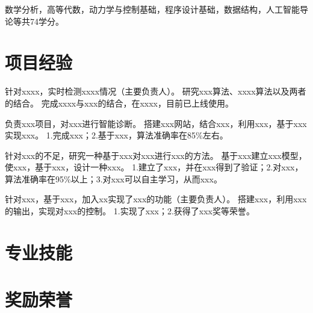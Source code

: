 \documentclass{resume}
\begin{document}
\qquad \qquad 数学分析，高等代数，动力学与控制基础，程序设计基础，数据结构，人工智能导论等共74学分。

\section{项目经验}
\Content
{针对xxxx，实时检测xxxx情况（主要负责人）。}
{研究xxx算法、xxxx算法以及两者的结合。}
{完成xxxx与xxx的结合，在xxxx，目前已上线使用。}

\Content
{负责xxx项目，对xxx进行智能诊断。}
{搭建xxx网站，结合xxx，利用xxx，基于xxx实现xxx。}
{1.完成xxx；2.基于xxx，算法准确率在85\%左右。}

\Content
{针对xxx的不足，研究一种基于xxx对xxx进行xxx的方法。}
{基于xxx建立xxx模型，使xxx，基于xxx，设计一种xxx。}
{1.建立了xxx，并在xxx得到了验证；2.对xxx，算法准确率在95\%以上；3.对xxx可以自主学习，从而xxx。}

\Content
{针对xxx，基于xxx，加入xx实现了xxx的功能（主要负责人）。}
{搭建xxx，利用xxx的输出，实现对xxx的控制。}
{1.实现了xxx；2.获得了xxx奖等荣誉。}

\section{专业技能}
\sepspace

\section{奖励荣誉}
\end{document}
